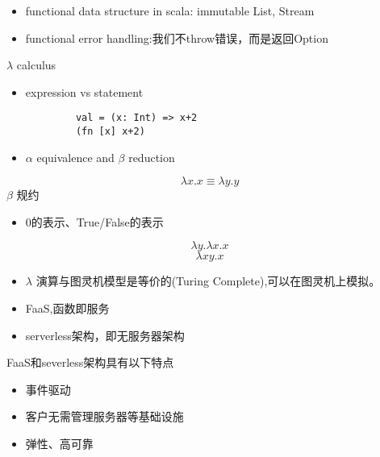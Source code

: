 \documentclass{beamer}
\begin{document}
    \begin{frame}
        \begin{itemize}
        	\item functional data structure in scala: immutable List, Stream
        	\item functional error handling:我们不throw错误，而是返回Option
        \end{itemize}    
    \end{frame}
    
    \begin{frame}[fragile]$\lambda$ calculus
	    \begin{itemize}
		    \item expression vs statement
	    \end{itemize}
        \begin{verbatim}
            val = (x: Int) => x+2
            (fn [x] x+2)
        \end{verbatim}
        \begin{itemize}
        	\item $\alpha$ equivalence and $\beta$ reduction
        \end{itemize}
            $$\lambda x.x \equiv \lambda y.y$$ 
            $\beta$ 规约
        \begin{itemize}
        	\item 0的表示、True/False的表示
        \end{itemize}
        $$\lambda y.\lambda x.x$$
        $$\lambda xy.x$$
        \begin{itemize}
        	\item $\lambda$ 演算与图灵机模型是等价的(Turing Complete),可以在图灵机上模拟。
        \end{itemize}
    \end{frame}

    \begin{frame}
        \begin{itemize}
        	\item FaaS,函数即服务
        	\item serverless架构，即无服务器架构
        \end{itemize}
        FaaS和severless架构具有以下特点
        \begin{itemize}
            \item 事件驱动
            \item 客户无需管理服务器等基础设施
            \item 弹性、高可靠
        \end{itemize}
    \end{frame}
    
\end{document}

